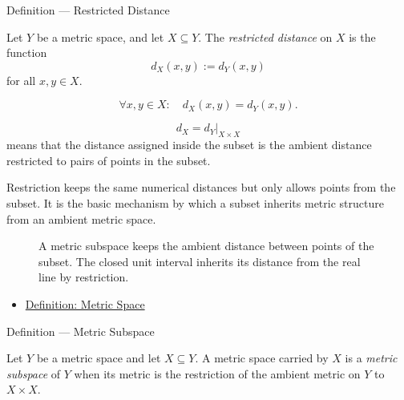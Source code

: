 \begin{definitionbox}{Definition --- Restricted Distance}
\begin{definition}\label{def:metric-restricted-distance}
Let \(Y\) be a metric space, and let \(X\subseteq Y\).  The
\emph{restricted distance} on \(X\) is the function
\[
  d_X(x,y):=d_Y(x,y)
\]
for all \(x,y\in X\).
\end{definition}
\end{definitionbox}

\begin{remark*}
\[
\forall x,y\in X{:}\quad d_X(x,y)=d_Y(x,y).
\]
\end{remark*}

\begin{remark*}
\[
d_X=d_Y|_{X\times X}
\]
means that the distance assigned inside the subset is the ambient distance
restricted to pairs of points in the subset.
\end{remark*}

\begin{remark*}[Interpretation]
Restriction keeps the same numerical distances but only allows points from
the subset.  It is the basic mechanism by which a subset inherits metric
structure from an ambient metric space.
\end{remark*}

\begin{figure}[htbp]
\centering

\caption{A metric subspace keeps the ambient distance between points of the
subset.  The closed unit interval inherits its distance from the real line by
restriction.}
\label{fig:restricted-distance-subspace}
\end{figure}


\begin{dependencies}
\begin{itemize}
  \item \hyperref[def:metric-space]{Definition: Metric Space}
\end{itemize}
\end{dependencies}

\begin{definitionbox}{Definition --- Metric Subspace}
\begin{definition}\label{def:metric-subspace}
Let \(Y\) be a metric space and let \(X\subseteq Y\).  A metric space carried
by \(X\) is a \emph{metric subspace} of \(Y\) when its metric is the
restriction of the ambient metric on \(Y\) to \(X\times X\).
\end{definition}
\end{definitionbox}

